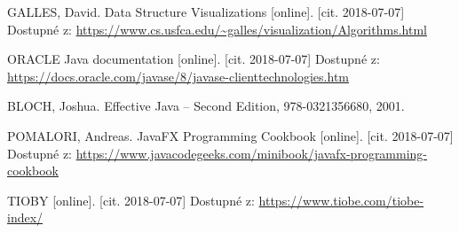 \documentclass[
  biblatex=false,
  font=serif,
  glossaries=false,
  tables=false,
  theorems=false,
  index
]{kidiplom}
\begin{document}
\begin{thebibliography}{99}
 \uppercase{Galles}, David. Data Structure Visualizations [online]. [cit. 2018-07-07]
Dostupné z: \url{https://www.cs.usfca.edu/~galles/visualization/Algorithms.html}

 ORACLE Java documentation [online]. [cit. 2018-07-07] Dostupné z: \url{https://docs.oracle.com/javase/8/javase-clienttechnologies.htm}

 \uppercase{Bloch}, Joshua. Effective Java -- Second Edition, 978-0321356680, 2001.

 \uppercase{Pomalori}, Andreas. JavaFX Programming Cookbook [online]. [cit. 2018-07-07] Dostupné z: \url{https://www.javacodegeeks.com/minibook/javafx-programming-cookbook}

 \uppercase{Tioby} [online]. [cit. 2018-07-07] Dostupné z: \url{https://www.tiobe.com/tiobe-index/}


\end{thebibliography}
%
%



\printindex
\end{document}
